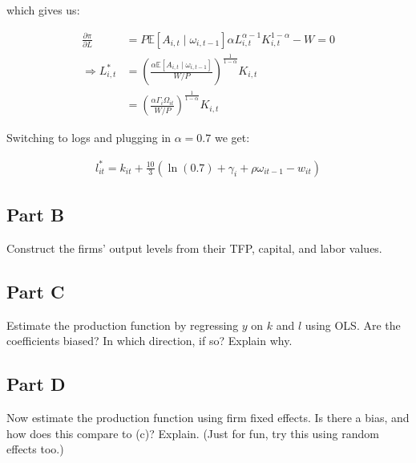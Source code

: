\documentclass[10pt]{article}
\begin{document}
which gives us:

\begin{align}
    \frac{\partial \pi}{\partial L} &= P \mathbb{E}[A_{i,t} \mid \omega_{i, t-1}] \alpha L_{i,t}^{\alpha-1} K_{i,t}^{1-\alpha} - W = 0 \\
    \Rightarrow L_{i,t}^* &= \left(\frac{\alpha \mathbb{E}[A_{i,t} \mid \omega_{i, t-1}]}{W / P}\right)^{\frac{1}{1-\alpha}} K_{i,t} \\
    &= \left(\frac{\alpha \Gamma_i \Omega_{it}}{W / P}\right)^{\frac{1}{1-\alpha}} K_{i,t}
\end{align}

Switching to logs and plugging in $\alpha = 0.7$ we get:

\begin{align}
    l_{i t}^*=k_{i t}+\frac{10}{3}\left(\ln (0.7)+\gamma_i+\rho \omega_{i t-1}-w_{i t}\right)
\end{align}


\subsection{Part B}

Construct the firms' output levels from their TFP, capital, and labor values.

\hrulefill\hspace{0.5em}\dotfill\hspace{0.5em}\hrulefill

\subsection{Part C}

Estimate the production function by regressing $y$ on $k$ and $l$ using OLS. Are the coefficients biased? In which direction, if so? Explain why.

\hrulefill\hspace{0.5em}\dotfill\hspace{0.5em}\hrulefill

\subsection{Part D}

Now estimate the production function using firm fixed effects. Is there a bias, and how does this compare to (c)? Explain. (Just for fun, try this using random effects too.)

\hrulefill\hspace{0.5em}\dotfill\hspace{0.5em}\hrulefill
\end{document}
